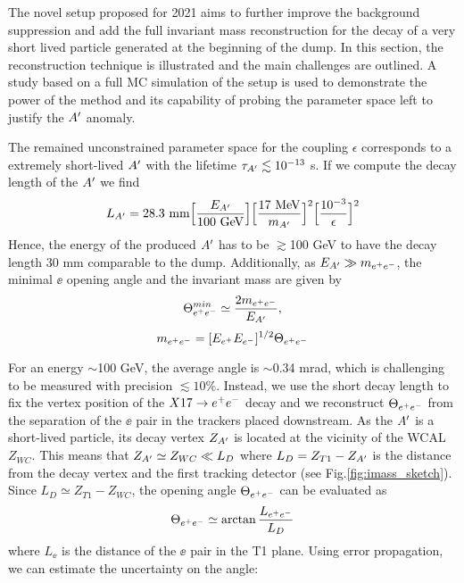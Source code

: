 The novel setup proposed for 2021 aims to further improve the background suppression and add the full invariant mass reconstruction for the decay of a very short lived particle generated at the beginning of the dump. In this section, the reconstruction technique is illustrated and the main challenges are outlined. A study based on a full MC simulation of the setup is used to demonstrate the power of the method and its capability of probing the parameter space left to justify the $A'$ anomaly.

The remained unconstrained parameter space for the coupling $\epsilon$  corresponds to a extremely short-lived $A'$ with the lifetime $\tau_{A'} \lesssim 10^{-13}$ s. If we compute the decay length of the $A'$ we find 
\begin{equation}
L_{A'} = 28.3 ~{\rm mm}  \Bigl[\frac{E_{A'}}{100~ \text{GeV}}\Bigr] \Bigl[\frac{17~ \text{MeV}}{m_{A'}}\Bigr]^2 \Bigl[\frac{10^{-3}}{\epsilon}\Bigr]^2
\label{eqn:length}
\end{equation}
Hence, the energy of the produced $A'$ has to be $\gtrsim$100 GeV to have the decay length 30 mm comparable to the dump.
Additionally, as $E_{A'} \gg m_{e^+e^-}$, the minimal $\ee$ opening angle and the invariant mass are given by
\begin{equation} 
\Theta_{ e^+e^-}^{min} \simeq  \frac{2m_{e^+e^-}}{E_{A'}},
\label{eqn:angle}
\end{equation}
\begin{equation}
m_{e^+e^-} = [E_{e^+} E_{e^-}]^{1/2} \Theta_{ e^+e^-}
\label{eqn:imass}
\end{equation}

For an energy $\sim$100 GeV, the average angle is $\sim$0.34 mrad, which is challenging to be measured with precision $\lesssim 10\%$. Instead, we use the short decay length to fix the vertex position of the $X17 \rightarrow e^+ e^-$ decay and we reconstruct $\Theta_{ e^+e^-}$ from the separation of the $\ee$ pair in the trackers placed downstream. As the $A'$ is a short-lived particle, its decay vertex $Z_{A'}$ is located at the vicinity of the WCAL $Z_{WC}$. This means that $Z_{A'} \simeq Z_{WC} \ll L_D$ where $L_D=Z_{T1}-Z_{A'}$ is the distance from the decay vertex and the first tracking detector (see Fig.\ref{fig:imass_sketch}). Since $L_D \simeq Z_{T1} - Z_{WC}$, the opening angle $\Theta_{ e^+e^-}$ can be evaluated as 
\begin{equation}
\Theta_{ e^+e^-} \simeq \arctan{\frac{ L_{e^+e^-}}{L_D}}
\label{angle-est}
\end{equation}
where $L_{\ee}$ is the distance of the $\ee$ pair in the T1 plane. Using error propagation, we can estimate the uncertainty on the angle:

